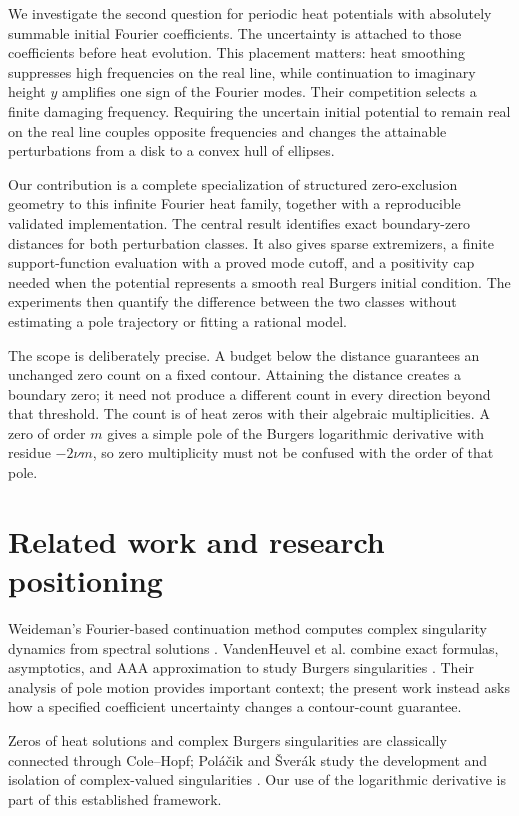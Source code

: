 \documentclass[11pt]{article}
\begin{document}
We investigate the second question for periodic heat potentials with absolutely summable initial Fourier coefficients. The uncertainty is attached to those coefficients before heat evolution. This placement matters: heat smoothing suppresses high frequencies on the real line, while continuation to imaginary height $y$ amplifies one sign of the Fourier modes. Their competition selects a finite damaging frequency. Requiring the uncertain initial potential to remain real on the real line couples opposite frequencies and changes the attainable perturbations from a disk to a convex hull of ellipses.

Our contribution is a complete specialization of structured zero-exclusion geometry to this infinite Fourier heat family, together with a reproducible validated implementation. The central result identifies exact boundary-zero distances for both perturbation classes. It also gives sparse extremizers, a finite support-function evaluation with a proved mode cutoff, and a positivity cap needed when the potential represents a smooth real Burgers initial condition. The experiments then quantify the difference between the two classes without estimating a pole trajectory or fitting a rational model.

The scope is deliberately precise. A budget below the distance guarantees an unchanged zero count on a fixed contour. Attaining the distance creates a boundary zero; it need not produce a different count in every direction beyond that threshold. The count is of heat zeros with their algebraic multiplicities. A zero of order $m$ gives a simple pole of the Burgers logarithmic derivative with residue $-2\nu m$, so zero multiplicity must not be confused with the order of that pole.

\section{Related work and research positioning}
Weideman's Fourier-based continuation method computes complex singularity dynamics from spectral solutions \cite{weideman}. VandenHeuvel et al. combine exact formulas, asymptotics, and AAA approximation to study Burgers singularities \cite{vandenheuvel}. Their analysis of pole motion provides important context; the present work instead asks how a specified coefficient uncertainty changes a contour-count guarantee.

Zeros of heat solutions and complex Burgers singularities are classically connected through Cole--Hopf; Pol\'a\v cik and \v Sver\'ak study the development and isolation of complex-valued singularities \cite{polacik}. Our use of the logarithmic derivative is part of this established framework.
\end{document}
